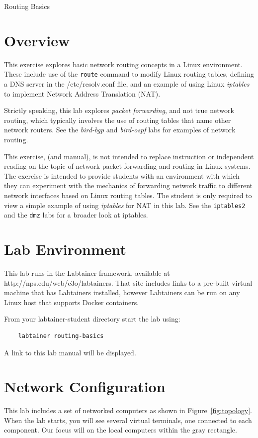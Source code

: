 


\begin{center}
{\LARGE Routing Basics}
\vspace{0.1in}\\
\end{center}

\section{Overview}
This exercise explores basic network routing concepts 
in a Linux environment.  These include use of the \texttt{route}
command to modify Linux routing tables, defining a DNS server in the /etc/resolv.conf file,
and an example of using Linux \textit{iptables} to implement Network Address Translation (NAT). 

Strictly speaking, this lab explores \textit{packet forwarding},
and not true network routing, which typically involves the use of
routing tables that name other network routers.  See the
\textit{bird-bgp} and \textit{bird-ospf} labs for examples of 
network routing.

This exercise, (and manual), is not intended to replace instruction
or independent reading on the topic of network packet forwarding and
routing in Linux systems. The exercise is intended to provide
students with an environment with which they can experiment
with the mechanics of forwarding network traffic to different network
interfaces based on Linux routing tables.  The student is only required
to view a simple example of using \textit{iptables} for NAT
in this lab.  See the {\tt iptables2} and the {\tt dmz} labs for a broader
look at iptables.

\section{Lab Environment}
This lab runs in the Labtainer framework,
available at http://nps.edu/web/c3o/labtainers.
That site includes links to a pre-built virtual machine
that has Labtainers installed, however Labtainers can
be run on any Linux host that supports Docker containers.

From your labtainer-student directory start the lab using:
\begin{verbatim}
    labtainer routing-basics
\end{verbatim}
\noindent A link to this lab manual will be displayed.  

\section{Network Configuration}
This lab includes a set of networked computers as shown in Figure~\ref{fig:topology}.
When the lab starts, you will see several virtual terminals, one connected to each
component.  Our focus will on the local computers within the gray rectangle.

